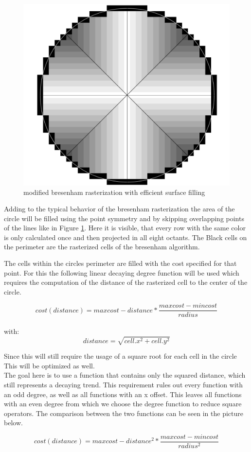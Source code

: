 \begin{figure}
	\centering
	\includegraphics[width=.5\textwidth]{Pictures/rasterization}
	\caption{modified bresenham rasterization with efficient surface filling}
	\label{rasterization}
\end{figure}


Adding to the typical behavior of the bresenham rasterization the area of the circle will be filled using the point symmetry and by skipping overlapping points of the lines like in Figure \ref{rasterization}. Here it is visible, that every row with the same color is only calculated once and then projected in all eight octants. The Black cells on the perimeter are the rasterized cells of the bresenham algorithm.

The cells within the circles perimeter are filled with the cost specified for that point. For this the following linear decaying  degree function will be used which requires the computation of the distance of the rasterized cell to the center of the circle.

\[cost(distance)=maxcost-distance*\frac{maxcost-mincost}{radius}\]\\
with: \[distance=\sqrt{cell.x^2+cell.y^2}\]

 Since this will still require the usage of a square root for each cell in the circle This will be optimized as well.\\

The goal here is to use a function that contains only the squared distance, which still represents a decaying trend. This requirement rules out every function with an odd degree, as well as all functions with an x offset. This leaves all functions with an even degree from which we choose the  degree function to reduce square operators. The comparison between the two functions can be seen in the picture below.

\[cost(distance)=maxcost-distance^2*\frac{maxcost-mincost}{radius^2}\]\\

